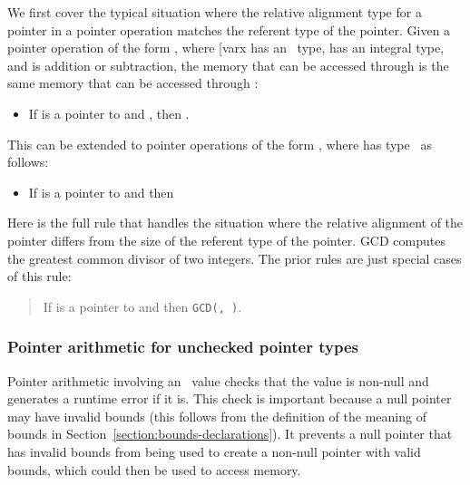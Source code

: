 We first cover the typical situation where the relative alignment type
for a pointer in a pointer operation matches the referent type of the
pointer. Given a pointer operation of the form , where [var{x}
has an \arrayptr\ type,  has an integral type, and
 is addition or subtraction, the memory that can be accessed
through  is the same memory that can be accessed through
:

\begin{itemize}
\item
  If  is a pointer to  and 
  ,
  then .
\end{itemize}

This can be extended to pointer operations of the form ,
where  has type
\arrayptrT\ as
follows:

\begin{itemize}
\item
  If  is a pointer to  and 
  then 
\end{itemize}

Here is the full rule that handles the situation where the relative
alignment of the pointer differs from the size of the referent type of
the pointer. GCD computes the greatest common divisor of two integers.
The prior rules are just special cases of this rule:

\begin{quote}
If  is a pointer to  and 
            {
                       {}
                       {}}
then 
                 {
                            {}
                            {\texttt{GCD(, )}}}.
\end{quote}

\subsubsection{Pointer arithmetic for unchecked pointer types}

Pointer arithmetic involving an \arrayptr\ value checks that
the value is non-null and generates a runtime error if it is. This check
is important because a null pointer may have invalid bounds (this
follows from the definition of the meaning of bounds in 
Section~\ref{section:bounds-declarations}). It
prevents a null pointer that has invalid bounds from being used to create a
non-null pointer with valid bounds, which could then be used to access
memory.

